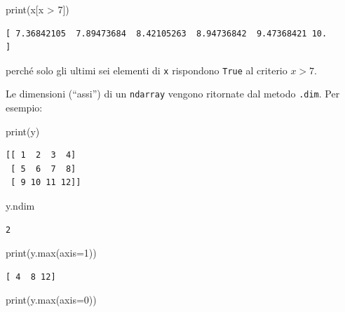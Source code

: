 \documentclass[
  letterpaper,
  krantz2]{{[}./krantz{]}}
\newenvironment{Shaded}{\begin{snugshade}}{\end{snugshade}}
\newcommand{\BuiltInTok}[1]{\textcolor[rgb]{0.00,0.23,0.31}{#1}}
\newcommand{\DecValTok}[1]{\textcolor[rgb]{0.68,0.00,0.00}{#1}}
\newcommand{\NormalTok}[1]{\textcolor[rgb]{0.00,0.23,0.31}{#1}}
\newcommand{\OperatorTok}[1]{\textcolor[rgb]{0.37,0.37,0.37}{#1}}
\begin{document}
\begin{Shaded}
\begin{Highlighting}[]
\BuiltInTok{print}\NormalTok{(x[x }\OperatorTok{\textgreater{}} \DecValTok{7}\NormalTok{])}
\end{Highlighting}
\end{Shaded}

\begin{verbatim}
[ 7.36842105  7.89473684  8.42105263  8.94736842  9.47368421 10.        ]
\end{verbatim}

perché solo gli ultimi sei elementi di \texttt{x} rispondono
\texttt{True} al criterio \(x > 7\).

Le dimensioni (``assi'') di un \texttt{ndarray} vengono ritornate dal
metodo \texttt{.dim}. Per esempio:

\begin{Shaded}
\begin{Highlighting}[]
\BuiltInTok{print}\NormalTok{(y)}
\end{Highlighting}
\end{Shaded}

\begin{verbatim}
[[ 1  2  3  4]
 [ 5  6  7  8]
 [ 9 10 11 12]]
\end{verbatim}

\begin{Shaded}
\begin{Highlighting}[]
\NormalTok{y.ndim}
\end{Highlighting}
\end{Shaded}

\begin{verbatim}
2
\end{verbatim}

\begin{Shaded}
\begin{Highlighting}[]
\BuiltInTok{print}\NormalTok{(y.}\BuiltInTok{max}\NormalTok{(axis}\OperatorTok{=}\DecValTok{1}\NormalTok{))}
\end{Highlighting}
\end{Shaded}

\begin{verbatim}
[ 4  8 12]
\end{verbatim}

\begin{Shaded}
\begin{Highlighting}[]
\BuiltInTok{print}\NormalTok{(y.}\BuiltInTok{max}\NormalTok{(axis}\OperatorTok{=}\DecValTok{0}\NormalTok{))}
\end{Highlighting}
\end{Shaded}
\end{document}
